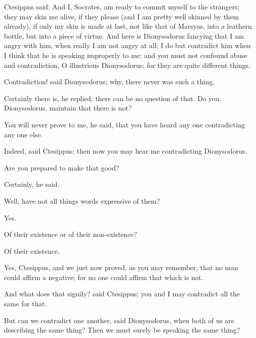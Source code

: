 \documentclass[11pt,letter]{article}
\begin{document}
\par  Ctesippus said: And I, Socrates, am ready to commit myself to the strangers; they may skin me alive, if they please (and I am pretty well skinned by them already), if only my skin is made at last, not like that of Marsyas, into a leathern bottle, but into a piece of virtue. And here is Dionysodorus fancying that I am angry with him, when really I am not angry at all; I do but contradict him when I think that he is speaking improperly to me: and you must not confound abuse and contradiction, O illustrious Dionysodorus; for they are quite different things.

\par  Contradiction! said Dionysodorus; why, there never was such a thing.

\par  Certainly there is, he replied; there can be no question of that. Do you, Dionysodorus, maintain that there is not?

\par  You will never prove to me, he said, that you have heard any one contradicting any one else.

\par  Indeed, said Ctesippus; then now you may hear me contradicting Dionysodorus.

\par  Are you prepared to make that good?

\par  Certainly, he said.

\par  Well, have not all things words expressive of them?

\par  Yes.

\par  Of their existence or of their non-existence?

\par  Of their existence.

\par  Yes, Ctesippus, and we just now proved, as you may remember, that no man could affirm a negative; for no one could affirm that which is not.

\par  And what does that signify? said Ctesippus; you and I may contradict all the same for that.

\par  But can we contradict one another, said Dionysodorus, when both of us are describing the same thing? Then we must surely be speaking the same thing?
\end{document}
